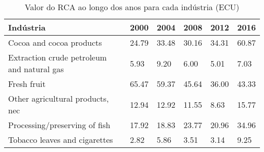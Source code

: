 \begin{table}
\centering
\caption{Valor do RCA ao longo dos anos para cada indústria (ECU)}
\label{tab:ex3-tempo-ECU}
\begin{tabular}{p{6cm}p{1.5cm}p{1.5cm}p{1.5cm}p{1.5cm}p{1.5cm}}
\toprule
                                 Indústria &  2000 &  2004 &  2008 &  2012 &  2016 \\
\midrule
                  Cocoa and cocoa products & 24.79 & 33.48 & 30.16 & 34.31 & 60.87 \\
Extraction crude petroleum and natural gas &  5.93 &  9.20 &  6.00 &  5.01 &  7.03 \\
                               Fresh fruit & 65.47 & 59.37 & 45.64 & 36.00 & 43.33 \\
          Other agricultural products, nec & 12.94 & 12.92 & 11.55 &  8.63 & 15.77 \\
             Processing/preserving of fish & 17.92 & 18.83 & 23.77 & 20.96 & 34.96 \\
             Tobacco leaves and cigarettes &  2.82 &  5.86 &  3.51 &  3.14 &  9.25 \\
\bottomrule
\end{tabular}
\end{table}
